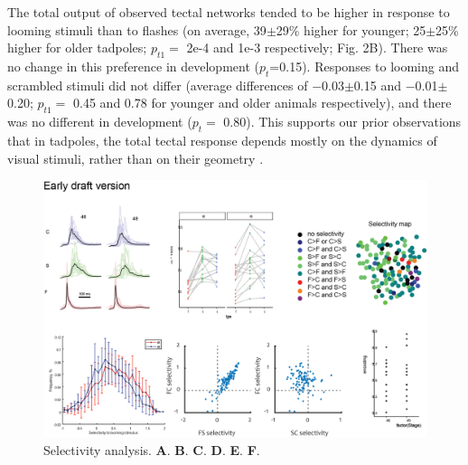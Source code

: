 \documentclass{article}
\begin{document}
The total output of observed tectal networks tended to be higher in response to looming stimuli than to flashes (on average, 39$\pm$29\% higher for younger; 25$\pm$25\% higher for older tadpoles; $p_{t1}=$ 2e-4 and 1e-3 respectively; Fig. 2B). There was no change in this preference in development ($p_t$=0.15). Responses to looming and scrambled stimuli did not differ (average differences of $-$0.03$\pm$0.15 and $-$0.01$\pm$0.20; $p_{t1}=$ 0.45 and 0.78 for younger and older animals respectively), and there was no different in development ($p_t=$ 0.80). This supports our prior observations that in tadpoles, the total tectal response depends mostly on the dynamics of visual stimuli, rather than on their geometry \citep{khakhalin2014,jang2016}.

\begin{figure}
\includegraphics[width=\linewidth]{fig2.png}
\caption{
Selectivity analysis. \textbf{A}. \textbf{B}. \textbf{C}. \textbf{D}. \textbf{E}. \textbf{F}. }
\end{figure}
\end{document}
